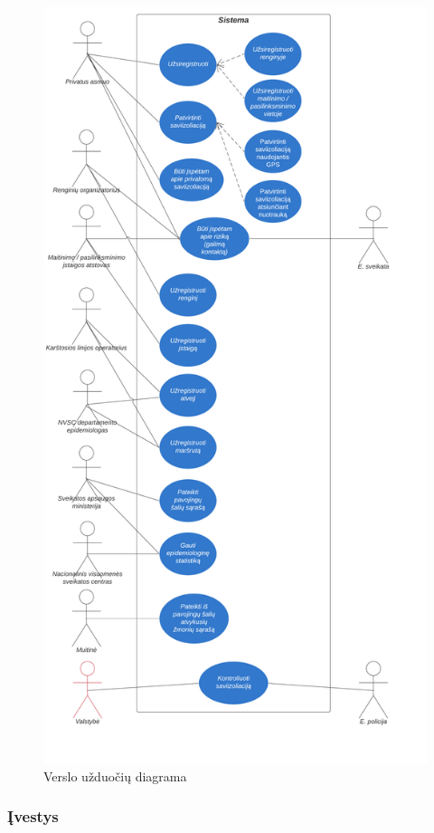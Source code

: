 \documentclass{VUMIFPSkursinis}
\begin{document}
\begin{figure}[H]
	\centering
	\includegraphics[scale=0.6]{img/use_case_diagram_business.png}
	\caption{Verslo užduočių diagrama}
	\label{img:use_case_diagram}
\end{figure}
\newpage
\subsubsection{Įvestys}\label{sec:versloReqWhyInput}
\end{document}
